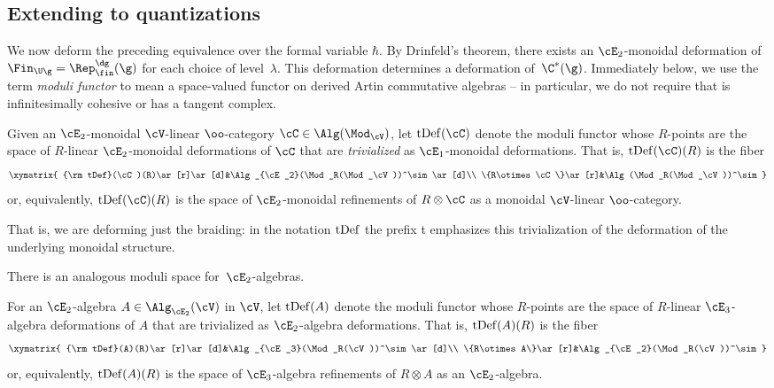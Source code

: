 \documentclass[10pt]{amsart}
\begin{document}
\subsection{Extending to quantizations}

We now deform the preceding equivalence over the formal variable $\hbar$.
By Drinfeld's theorem, 
there exists an $\cE_2$-monoidal deformation of $\Fin_{\U\g} = \Rep^{\dg}_{\fin}(\g)$ for each choice of level~$\lambda$. 
This deformation determines a deformation of~$\C^\ast(\g)$. 
Immediately below, we use the term {\it moduli functor} to mean a space-valued functor on derived Artin commutative algebras -- in particular, we do not require that is infinitesimally cohesive or has a tangent complex.

\begin{dfn}
Given an $\cE_2$-monoidal $\cV$-linear $\oo$-category $\cC\in \Alg(\Mod_\cV)$, 
let ${\rm tDef}(\cC)$ denote the moduli functor whose $R$-points are the space of $R$-linear $\cE_2$-monoidal deformations of $\cC$ that are {\em trivialized} as $\cE_1$-monoidal deformations. 
That is, ${\rm tDef}(\cC)(R)$ is the fiber
\[
\xymatrix{
{\rm tDef}(\cC)(R)\ar[r]\ar[d]&\Alg_{\cE_2}(\Mod_R(\Mod_\cV))^\sim\ar[d]\\
\{R\otimes \cC\}\ar[r]&\Alg(\Mod_R(\Mod_\cV))^\sim}
\]
or, equivalently, ${\rm tDef}(\cC)(R)$ is the space of $\cE_2$-monoidal refinements of $R\otimes \cC$ as a monoidal $\cV$-linear $\oo$-category.
\end{dfn}

That is, we are deforming just the braiding: in the notation ${\rm tDef}$ the prefix t emphasizes this trivialization of the deformation of the underlying monoidal structure.

There is an analogous moduli space for~$\cE_2$-algebras.

\begin{dfn}
For an $\cE_2$-algebra $A\in \Alg_{\cE_2}(\cV)$ in $\cV$, 
let ${\rm tDef}(A)$ denote the moduli functor whose $R$-points are the space of $R$-linear $\cE_3$-algebra deformations of $A$ that are trivialized as $\cE_2$-algebra deformations. 
That is, ${\rm tDef}(A)(R)$ is the fiber
\[
\xymatrix{
{\rm tDef}(A)(R)\ar[r]\ar[d]&\Alg_{\cE_3}(\Mod_R(\cV))^\sim\ar[d]\\
\{R\otimes A\}\ar[r]&\Alg_{\cE_2}(\Mod_R(\cV))^\sim}
\]
or, equivalently, ${\rm tDef}(A)(R)$ is the space of $\cE_3$-algebra refinements of $R\otimes A$ as an $\cE_2$-algebra. 
\end{dfn}
\end{document}
